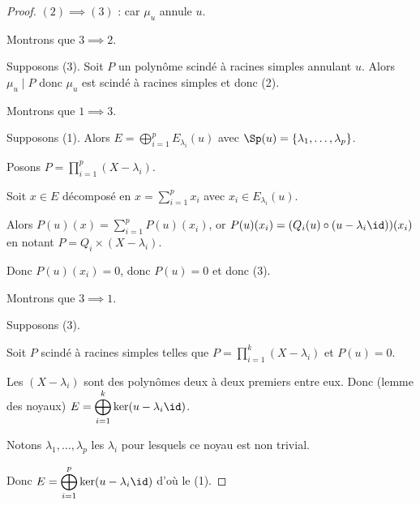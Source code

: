 \begin{proof}
    $(2) \implies (3)$ : car $\mu_u$ annule $u$.

    \lvspace Montrons que $3 \implies 2$.
    
    Supposons (3). Soit $P$ un polynôme scindé à racines simples annulant $u$. Alors $\mu_u \mid P$ donc 
    $\mu_u$ est scindé à racines simples et donc (2).

    \lvspace Montrons que $1 \implies 3$. 
    
    Supposons (1). 
    Alors $E = \displaystyle \bigoplus_{i = 1 }^{ p } E_{\lambda_i}(u)$ avec $\Sp(u) = \{\lambda_1, \ldots, \lambda_p\}$.

    Posons $P = \displaystyle \prod_{i = 1 }^{ p } (X - \lambda_i)$.

    Soit $x \in E$ décomposé en $x = \displaystyle \sum_{i = 1 }^{ p } x_i$ avec $x_i \in E_{\lambda_i}(u)$.

    Alors $P(u)(x) = \displaystyle \sum_{i = 1 }^{ p } P(u)(x_i)$, or $P(u)(x_i) = (Q_i(u) \circ (u - \lambda_i \id))(x_i)$
    en notant $P = Q_i \times (X - \lambda_i)$.

    Donc $P(u)(x_i) = 0$, donc $P(u) = 0$ et donc (3).

    \lvspace Montrons que $3 \implies 1$. 
    
    Supposons (3). 

    Soit $P$ scindé à racines simples telles que $P = \displaystyle \prod_{i = 1 }^{ k } (X - \lambda_i)$
    et $P(u) = 0$.

    Les $(X - \lambda_i)$ sont des polynômes deux à deux premiers entre eux. Donc 
    (lemme des noyaux) $E = \displaystyle \bigoplus_{i = 1 }^{ k } \ker (u - \lambda_i \id)$.

    Notons $\lambda_1, \dots, \lambda_p$ les $\lambda_i$ pour lesquels ce noyau est non trivial.

    Donc $E = \displaystyle \bigoplus_{i = 1 }^{ p } \ker (u - \lambda_i \id) $ d'où le (1).
\end{proof}

